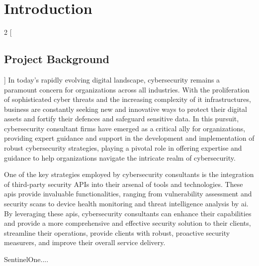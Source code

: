 \chapter{Introduction}
\begin{multicols}{2}
      [\section{Project Background}]
      In today's rapidly evolving digital landscape, cybersecurity remains a paramount concern for organizations
      across all industries. With the proliferation of sophisticated cyber threats and the increasing complexity of
      \acrshort{it} infrastructures, business are constantly seeking new and innovative ways to protect their
      digital assets and fortify their defences and safeguard sensitive data. In this pursuit, cybersecurity
      consultant firms have emerged as a critical ally for organizations, providing expert guidance and support in
      the development and implementation of robust cybersecurity strategies, playing a pivotal role in offering
      expertise and guidance to help organizations navigate the intricate realm of cybersecurity.

      One of the key strategies employed by cybersecurity consultants is the integration of third-party security
      \gls{API}s into their arsenal of tools and technologies. These \acrshort{api}s provide invaluable
      functionalities, ranging from vulnerability assessment and security scans to device health monitoring and
      threat intelligence analysis by \acrshort{ai}. By leveraging these \acrshort{api}s, cybersecurity consultants
      can enhance their capabilities and provide a more comprehensive and effective security solution to their
      clients, streamline their operations, provide clients with robust, proactive security measurers, and improve
      their overall service delivery.

      SentinelOne....


\end{multicols}
